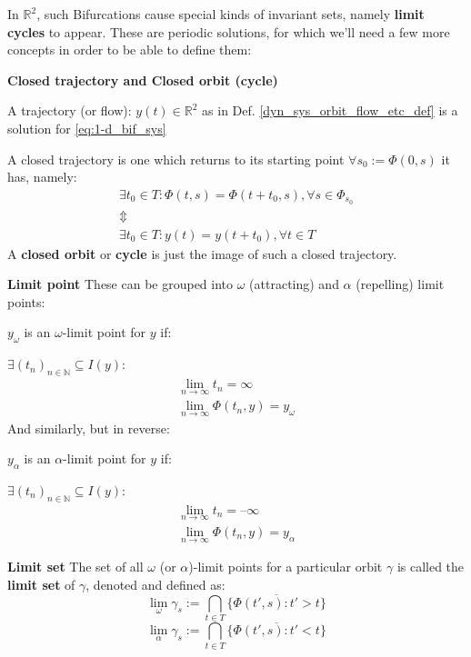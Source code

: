 In $\mathbb{R}^2$, such Bifurcations cause special kinds of invariant sets, namely \textbf{limit cycles} to appear. These are periodic solutions, for which we'll need a few more concepts in order to be able to define them:
\begin{definition} \textbf{Closed trajectory and Closed orbit (cycle)}

	A trajectory (or flow): $y(t) \in \mathbb{R}^2$ as in Def. \ref{dyn_sys_orbit_flow_etc_def} is a solution for \ref{eq:1-d_bif_sys}

	A closed trajectory is one which returns to its starting point $\forall s_0 := \Phi(0,s) $ it has, namely:
	\begin{gather*}
		\exists t_0 \in T : \Phi(t,s) = \Phi(t+t_0,s), \forall s \in \Phi_{s_0}     \\
		\Updownarrow \\
		\exists t_0 \in T : y(t) = y(t+t_0), \forall t \in T
	\end{gather*}
	A \textbf{closed orbit} or \textbf{cycle} is just the image of such a closed trajectory.
\end{definition}

\begin{definition}\textbf{Limit point}
	These can be grouped into $\omega$ (attracting) and $\alpha$ (repelling) limit points:

	$y_\omega$ is an $\omega$-limit point  for $y$ if:

	$\exists (t_n)_{n \in \mathbb{N}} \subseteq I(y) : $
	\begin{gather*}
		\lim_{n \rightarrow \infty} t_n = \infty  \\
		\lim_{n \rightarrow \infty} \Phi(t_n,y) = y_\omega
	\end{gather*}
	And similarly, but in reverse:

	$y_\alpha$ is an $\alpha$-limit point  for $y$ if:

	$\exists (t_n)_{n \in \mathbb{N}} \subseteq I(y) : $
	\begin{gather*}
		\lim_{n \rightarrow \infty} t_n = \textbf{--} \infty  \\
		\lim_{n \rightarrow \infty} \Phi(t_n,y) = y_\alpha
	\end{gather*}
\end{definition}

\begin{definition}\textbf{Limit set}
	The set of all $\omega$ (or $\alpha$)-limit points for a particular orbit $\gamma$ is called the \textbf{limit set} of $\gamma$, denoted and defined as:
	\[
		\lim_{\omega}\gamma_s := \bigcap_{t \in T} \overline{ \{ \Phi(t', s) : t' > t \} }
	\]
	\[
		\lim_{\alpha}\gamma_s := \bigcap_{t \in T} \overline{ \{ \Phi(t', s) : t' < t \} }
	\]
\end{definition}

